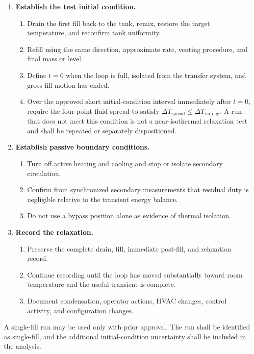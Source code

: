 \documentclass[11pt]{article}
\begin{document}
\begin{enumerate}
    \item \textbf{Establish the test initial condition.}
    \begin{enumerate}
        \item Drain the first fill back to the tank, remix, restore the target temperature, and reconfirm tank uniformity.
        \item Refill using the same direction, approximate rate, venting procedure, and final mass or level.
        \item Define $t=0$ when the loop is full, isolated from the transfer system, and gross fill motion has ended.
        \item Over the approved short initial-condition interval immediately after $t=0$, require the four-point fluid spread to satisfy $\Delta T_{\mathrm{spread}}\leq\Delta T_{\mathrm{iso,eng}}$. A run that does not meet this condition is not a near-isothermal relaxation test and shall be repeated or separately dispositioned.
    \end{enumerate}

    \item \textbf{Establish passive boundary conditions.}
    \begin{enumerate}
        \item Turn off active heating and cooling and stop or isolate secondary circulation.
        \item Confirm from synchronized secondary measurements that residual duty is negligible relative to the transient energy balance.
        \item Do not use a bypass position alone as evidence of thermal isolation.
    \end{enumerate}

    \item \textbf{Record the relaxation.}
    \begin{enumerate}
        \item Preserve the complete drain, fill, immediate post-fill, and relaxation record.
        \item Continue recording until the loop has moved substantially toward room temperature and the useful transient is complete.
        \item Document condensation, operator actions, HVAC changes, control activity, and configuration changes.
    \end{enumerate}
\end{enumerate}

A single-fill run may be used only with prior approval. The run shall be identified as single-fill, and the additional initial-condition uncertainty shall be included in the analysis.
\end{document}
